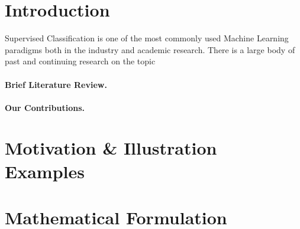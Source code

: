 \documentclass{article}
\begin{document}
\section{Introduction}  
Supervised Classification is one of the most commonly used Machine Learning paradigms both in the industry and academic research. There is a large body of past and continuing research on the topic







\paragraph{Brief Literature Review.}


\cite{weinberger2005distance}



\cite{xing2003distance}




\cite{weinberger2009distance}



\cite{yang2006efficient}

\cite{ying2012distance}


\cite{schultz2004learning}

\cite{rosales2006learning}



 
\paragraph{Our Contributions.} 
 
 
 
 
 
 
\section{Motivation \& Illustration Examples}
 
 
 


\section{Mathematical Formulation} 
 
\end{document}
